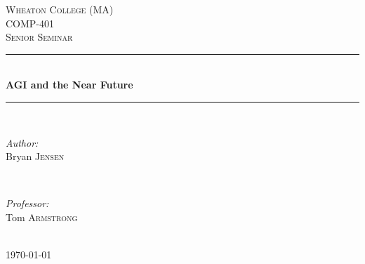 \documentclass[12pt]{article} %
\begin{document}

\begin{titlepage}

\newcommand{\HRule}{\rule{\linewidth}{0.5mm}} %

\center %

\textsc{\LARGE Wheaton College (MA)}\\[1.5cm] %
\textsc{\Large COMP-401}\\[0.5cm] %
\textsc{\large Senior Seminar}\\[0.5cm] %

\HRule \\[0.4cm]
{ \huge \bfseries AGI and the Near Future}\\[0.4cm] %
\HRule \\[1.5cm]

\begin{minipage}{0.4\textwidth}
\begin{flushleft} \large
\emph{Author:}\\
Bryan \textsc{Jensen} %
\end{flushleft}
\end{minipage}
~
\begin{minipage}{0.4\textwidth}
\begin{flushright} \large
\emph{Professor:} \\
Tom \textsc{Armstrong} %
\end{flushright}
\end{minipage}\\[4cm]

{\large \today}\\[3cm] %


\vfill %

\end{titlepage}

\end{document}
